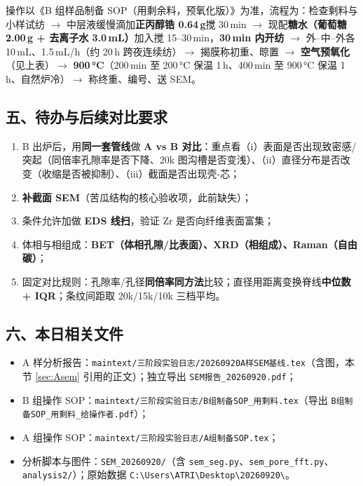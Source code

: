 操作以《B 组样品制备 SOP（用剩余料，预氧化版）》为准，流程为：检查剩料与小样试纺 $\rightarrow$ 中层液缓慢滴加\textbf{正丙醇锆 0.64\,g}搅 30\,min $\rightarrow$ 现配\textbf{糖水（葡萄糖 2.00\,g + 去离子水 3.0\,mL）}加入搅 15--30\,min，\textbf{30\,min 内开纺} $\rightarrow$ 外--中--外各 10\,mL、1.5\,mL/h（约 20\,h 跨夜连续纺）$\rightarrow$ 揭膜称初重、晾置 $\rightarrow$ \textbf{空气预氧化}（见上表）$\rightarrow$ \textbf{ 900\,°C}（200\,min 至 200\,°C 保温 1\,h、400\,min 至 900\,°C 保温 1\,h、自然炉冷）$\rightarrow$ 称终重、编号、送 SEM。

\subsection{五、待办与后续对比要求}

\begin{enumerate}
  \item B 出炉后，用\textbf{同一套管线}做 \textbf{A vs B 对比}：重点看（i）表面是否出现致密感/突起（同倍率孔隙率是否下降、20k 图沟槽是否变浅）、（ii）直径分布是否改变（收缩是否被抑制）、（iii）截面是否出现壳-芯；
  \item \textbf{补截面 SEM}（苦瓜结构的核心验收项，此前缺失）；
  \item 条件允许加做 \textbf{EDS 线扫}，验证 Zr 是否向纤维表面富集；
  \item 体相与相组成：\textbf{BET（体相孔隙/比表面）、XRD（相组成）、Raman（自由碳）}；
  \item 固定对比规则：孔隙率/孔径\textbf{同倍率同方法}比较；直径用距离变换脊线\textbf{中位数 + IQR}；条纹间距取 20k/15k/10k 三档平均。
\end{enumerate}

\subsection{六、本日相关文件}

\begin{itemize}
  \item A 样分析报告：\texttt{maintext/三阶段实验日志/20260920A样SEM基线.tex}（含图，本节 \ref{sec:Asem} 引用的正文）；独立导出 \texttt{SEM报告\_20260920.pdf}；
  \item B 组操作 SOP：\texttt{maintext/三阶段实验日志/B组制备SOP\_用剩料.tex}（导出 \texttt{B组制备SOP\_用剩料\_给操作者.pdf}）；
  \item A 组操作 SOP：\texttt{maintext/三阶段实验日志/A组制备SOP.tex}；
  \item 分析脚本与图件：\texttt{SEM\_20260920/}（含 \texttt{sem\_seg.py}、\texttt{sem\_pore\_fft.py}、\texttt{analysis2/}）；原始数据 \texttt{C:\textbackslash Users\textbackslash ATRI\textbackslash Desktop\textbackslash 20260920\textbackslash}。
\end{itemize}
